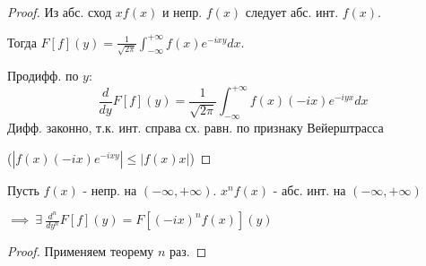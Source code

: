 \documentclass{article}
\begin{document}
\begin{proof}
  Из абс. сход $xf(x)$ и непр. $f(x)$ следует абс. инт. $f(x)$.

  Тогда $F[f](y)=\frac{1}{\sqrt{2\pi}}\int_{-\infty}^{+\infty}f(x)e^{-ixy}dx$.

Продифф. по $y$:
\[
  \frac{d}{dy}F[f](y)=\frac{1}{\sqrt{2\pi}}\int_{-\infty}^{+\infty}f(x)(-ix)e^{-iyx}dx
\]
Дифф. законно, т.к. инт. справа сх. равн. по признаку Вейерштрасса 

($|f(x)(-ix)e^{-ixy}|\le|f(x)x|$)
\end{proof}
\begin{corollary}
  Пусть $f(x)$ - непр. на $(-\infty,+\infty)$. $x^{n}f(x)$ - абс. инт. на $(-\infty,+\infty)$

  $\implies \ \exists \ \frac{d^{n}}{dy^{n}}F[f](y)=F[(-ix)^{n}f(x)](y)$
\end{corollary}
\begin{proof}
  Применяем теорему $n$ раз.
\end{proof}

\end{document}
